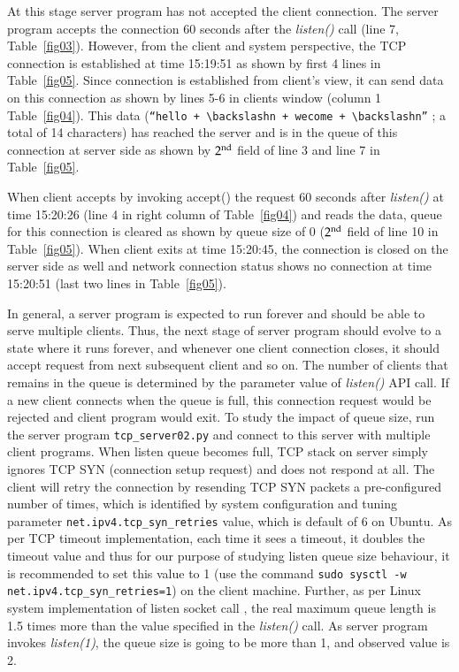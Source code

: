 \begin{multicols}{2}

At this stage server program has not accepted the client connection. The server program accepts the connection 60 seconds after the \textit{listen()} call (line 7, Table~\ref{fig03}). However, from the client and system perspective, the TCP connection is established at time 15:19:51 as shown by first 4 lines in Table~\ref{fig05}. Since connection is established from client’s view, it can send data on this connection as shown by lines 5-6 in clients window (column 1 Table~\ref{fig04}). This data (\texttt{“hello + $\backslash$n + wecome + $\backslash$n”} ; a total of 14 characters)  has reached the server and is in the queue of this connection at server side as shown by $2^{\rm{nd}}$ field of line  3 and line 7 in Table~\ref{fig05}.

When client accepts by invoking accept() the request 60 seconds after \textit{listen()} at time 15:20:26 (line 4 in right column of Table~\ref{fig04}) and reads the data, queue for this connection is cleared as shown by queue size of 0 ($2^{\rm{nd}}$ field of line 10 in Table~\ref{fig05}). When client exits at time 15:20:45, the connection is closed on the server side as well and network connection status shows no connection at time 15:20:51 (last two lines in Table~\ref{fig05}). 

In general, a server program is expected to run forever and should be able to serve multiple clients. Thus, the next stage of server program should evolve to a state where it runs forever, and whenever one client connection closes, it should accept request from next subsequent client and so on. The number of clients that remains in the queue is determined by the parameter value of \textit{listen()} API call. If a new client connects when the queue is full, this connection request would be rejected and client program would exit. To study the impact of queue size, run the server program \texttt{tcp\_server02.py}\cite{art1-key11} and connect to this server with multiple client programs. When listen queue becomes full, TCP stack on server simply ignores TCP SYN (connection setup request\cite{art1-key03}\cite{art1-key13}) and does not respond at all. The client will retry the connection by resending TCP SYN packets a pre-configured number of times, which is identified by system configuration and tuning parameter \texttt{net.ipv4.tcp\_syn\_retries} value, which is default of 6 on Ubuntu. As per TCP timeout implementation, each time it sees a timeout, it doubles the timeout value and thus for our purpose of studying listen queue size behaviour, it is recommended to set this value to 1 (use the command \texttt{sudo sysctl -w net.ipv4.tcp\_syn\_retries=1}) on the client machine. Further, as per Linux system implementation of listen socket call \cite{art1-key12}, the real maximum queue length is 1.5 times more than the value specified in the \textit{listen()} call. As server program invokes \textit{listen(1)}, the queue size is going to be more than 1, and observed value is 2.


\end{multicols}
